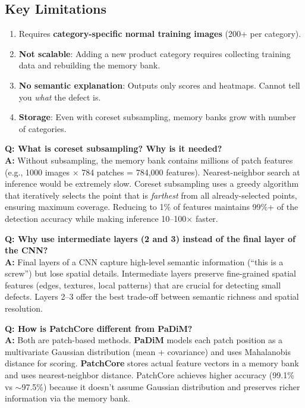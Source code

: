 \documentclass[12pt, a4paper]{article}
\begin{document}
\subsection{Key Limitations}
\begin{enumerate}[leftmargin=*]
    \item Requires \textbf{category-specific normal training images} (200+ per category).
    \item \textbf{Not scalable}: Adding a new product category requires collecting training data and rebuilding the memory bank.
    \item \textbf{No semantic explanation}: Outputs only scores and heatmaps. Cannot tell you \textit{what} the defect is.
    \item \textbf{Storage}: Even with coreset subsampling, memory banks grow with number of categories.
\end{enumerate}

\begin{vivaqa}
\textbf{Q: What is coreset subsampling? Why is it needed?}\\[4pt]
\textbf{A:} Without subsampling, the memory bank contains millions of patch features (e.g., 1000 images $\times$ 784 patches = 784,000 features). Nearest-neighbor search at inference would be extremely slow. Coreset subsampling uses a greedy algorithm that iteratively selects the point that is \textit{farthest} from all already-selected points, ensuring maximum coverage. Reducing to 1\% of features maintains 99\%+ of the detection accuracy while making inference 10--100$\times$ faster.
\end{vivaqa}

\begin{vivaqa}
\textbf{Q: Why use intermediate layers (2 and 3) instead of the final layer of the CNN?}\\[4pt]
\textbf{A:} Final layers of a CNN capture high-level semantic information (``this is a screw'') but lose spatial details. Intermediate layers preserve fine-grained spatial features (edges, textures, local patterns) that are crucial for detecting small defects. Layers 2--3 offer the best trade-off between semantic richness and spatial resolution.
\end{vivaqa}

\begin{vivaqa}
\textbf{Q: How is PatchCore different from PaDiM?}\\[4pt]
\textbf{A:} Both are patch-based methods. \textbf{PaDiM} models each patch position as a multivariate Gaussian distribution (mean + covariance) and uses Mahalanobis distance for scoring. \textbf{PatchCore} stores actual feature vectors in a memory bank and uses nearest-neighbor distance. PatchCore achieves higher accuracy (99.1\% vs $\sim$97.5\%) because it doesn't assume Gaussian distribution and preserves richer information via the memory bank.
\end{vivaqa}
\end{document}
